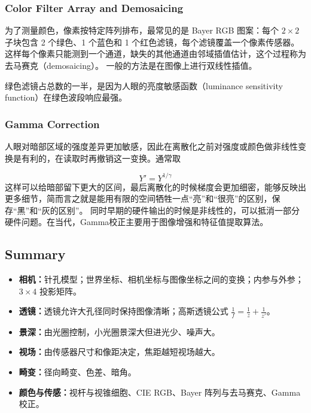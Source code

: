 \subsubsection{Color Filter Array and Demosaicing}

为了测量颜色，像素按特定阵列排布，最常见的是 Bayer RGB 图案：每个 $2\times2$ 子块包含 2 个绿色、1 个蓝色和 1 个红色滤镜，每个滤镜覆盖一个像素传感器。这样每个像素只能测到一个通道，缺失的其他通道由邻域插值估计，这个过程称为去马赛克（demosaicing）。
一般的方法是在图像上进行双线性插值。

绿色滤镜占总数的一半，是因为人眼的亮度敏感函数（luminance sensitivity function）在绿色波段响应最强。

\subsubsection{Gamma Correction}

人眼对暗部区域的强度差异更加敏感，因此在离散化之前对强度或颜色做非线性变换是有利的，在读取时再撤销这一变换。通常取

\[
Y' = Y^{1/\gamma}
\]
这样可以给暗部留下更大的区间，最后离散化的时候梯度会更加细密，能够反映出更多细节，简而言之就是能用有限的空间牺牲一点“亮”和“很亮”的区别，保存“黑”和“灰的区别”。
同时早期的硬件输出的时候是非线性的，可以抵消一部分硬件问题。在当代，Gamma校正主要用于图像增强和特征值提取算法。

\subsection{Summary}

\begin{itemize}
    \item \textbf{相机：}针孔模型；世界坐标、相机坐标与图像坐标之间的变换；内参与外参；$3\times4$ 投影矩阵。
    \item \textbf{透镜：}透镜允许大孔径同时保持图像清晰；高斯透镜公式 $\frac{1}{f} = \frac{1}{z} + \frac{1}{z'}$。
    \item \textbf{景深：}由光圈控制，小光圈景深大但进光少、噪声大。
    \item \textbf{视场：}由传感器尺寸和像距决定，焦距越短视场越大。
    \item \textbf{畸变：}径向畸变、色差、暗角。
    \item \textbf{颜色与传感：}视杆与视锥细胞、CIE RGB、Bayer 阵列与去马赛克、Gamma 校正。
\end{itemize}

